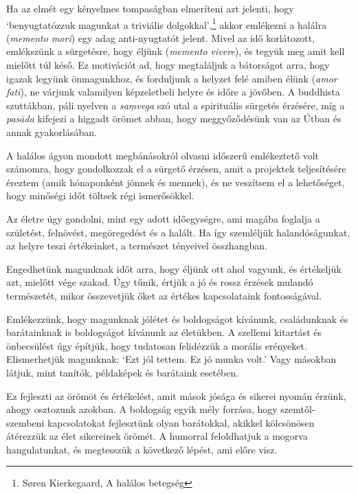 Ha az elmét egy kényelmes tompaságban elmeríteni azt jelenti, hogy
`benyugtatózzuk magunkat a triviális dolgokkal',\footnote{Søren Kierkegaard,
   A halálos betegség} akkor emlékezni a
halálra (\emph{memento mori}) egy adag anti-nyugtatót jelent. Mivel az
idő korlátozott, emlékszünk a sürgetésre, hogy éljünk (\emph{memento
vivere}), és tegyük meg amit kell mielőtt túl késő. Ez motivációt ad,
hogy megtaláljuk a bátorságot arra, hogy igazak legyünk önmagunkhoz, és
forduljunk a helyzet felé amiben élünk (\emph{amor fati}), ne várjunk
valamilyen képzeletbeli helyre és időre a jövőben. A buddhista
szuttákban, páli nyelven a \emph{saṃvega} szó utal a spirituális
sürgetés érzésére, míg a \emph{pasāda} kifejezi a higgadt örömet abban,
hogy meggyőződésünk van az Útban és annak gyakorlásában.

A halálos ágyon mondott megbánásokról olvasni időszerű emlékeztető volt
számomra, hogy gondolkozzak el a sürgető érzésen, amit a projektek
teljesítésére éreztem (amik hónaponként jönnek és mennek), és ne
veszítsem el a lehetőséget, hogy minőségi időt töltsek régi
ismerősökkel.

\enlargethispage*{\baselineskip}

Az életre úgy gondolni, mint egy adott időegységre, ami magába foglalja
a születést, felnövést, megöregedést és a halált. Ha így szemléljük
halandóságunkat, az helyre teszi értékeinket, a természet tényeivel
összhangban.

Engedhetünk magunknak időt arra, hogy éljünk ott ahol vagyunk, és
értékeljük azt, mielőtt vége szakad. Úgy tűnik, értjük a jó és rossz
érzések mulandó természetét, mikor összevetjük őket az értékes
kapcsolataink fontosságával.

Emlékezzünk, hogy magunknak jólétet és boldogságot kívánunk,
családunknak és barátainknak is boldogságot kívánunk az életükben. A
szellemi kitartást és önbecsülést úgy építjük, hogy tudatosan felidézzük
a morális erényeket. Elismerhetjük magunknak: `Ezt jól tettem. Ez jó
munka volt.' Vagy másokban látjuk, mint tanítók, példaképek és barátaink
esetében.

Ez fejleszti az örömöt és értékelést, amit mások jósága és sikerei
nyomán érzünk, ahogy osztozunk azokban. A boldogság egyik mély forrása,
hogy szemtől-szembeni kapcsolatokat fejlesztünk olyan barátokkal,
akikkel kölcsönösen átérezzük az élet sikereinek örömét. A humorral
feloldhatjuk a mogorva hangulatunkat, és megtesszük a következő lépést,
ami előre visz.

\enlargethispage*{\baselineskip}

